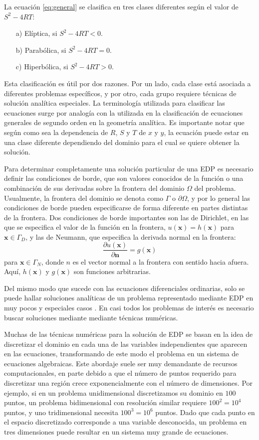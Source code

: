 La ecuación \eqref{eq:general} se clasifica en tres clases diferentes según el valor de $S^2-4RT$:
\begin{itemize}
 \item[a)] Elíptica, si $S^2-4RT < 0$.
 \item[b)] Parabólica, si $S^2-4RT = 0$.
 \item[c)] Hiperbólica, si $S^2-4RT > 0.$
\end{itemize}


Esta clasificación es útil por dos razones. Por un lado, cada clase está asociada a diferentes problemas específicos, y por otro, cada grupo requiere técnicas de solución analítica especiales. La terminología utilizada para clasificar las ecuaciones surge por analogía con la utilizada en la clasificación de ecuaciones generales de segundo orden en la geometría analítica. Es importante notar que según como sea la dependencia de $R$, $S$ y $T$ de $x$ y $y$, la ecuación puede estar en una clase diferente dependiendo del dominio para el cual se quiere obtener la solución.

Para determinar completamente una solución particular de una EDP es necesario definir las condiciones de borde, que son valores conocidos de la función o una combinación de sus derivadas sobre la frontera del dominio $\Omega$ del problema. Usualmente, la frontera del dominio se denota como $\Gamma$ o $\partial \Omega$, y por lo general las condiciones de borde pueden especificarse de forma diferente en partes distintas de la frontera. Dos condiciones de borde importantes son las de Dirichlet, en las que se especifica el valor de la función en la frontera, $u(\bm{x}) = h(\bm{x})$ para $\bm{x} \in \Gamma_D$, y las de Neumann, que especifica la derivada normal en la frontera:
\[ \frac{\partial u(\bm{x})}{\partial \bm{n}} = g(\bm{x}) \]
para $\bm{x} \in \Gamma_N$, donde $n$ es el vector normal a la frontera con sentido hacia afuera. Aquí, $h(\bm{x})$ y $g(\bm{x})$ son funciones arbitrarias.

Del mismo modo que sucede con las ecuaciones diferenciales ordinarias, solo se puede hallar soluciones analíticas de un problema representado mediante EDP en muy pocos y especiales casos \cite{tijonov1983}. En casi todos los problemas de interés es necesario buscar soluciones mediante mediante técnicas numéricas. 

Muchas de las técnicas numéricas para la solución de EDP se basan en la idea de discretizar el dominio en cada una de las variables independientes que aparecen en las ecuaciones, transformando de este modo el problema en un sistema de ecuaciones algebraicas. Este abordaje suele ser muy demandante de recursos computacionales, en parte debido a que el número de puntos requerido para discretizar una región crece exponencialmente con el número de dimensiones. Por ejemplo, si en un problema unidimensional discretizamos su dominio en $100$ puntos, un problema bidimensional con resolución similar requiere $100^2 = 10^4$ puntos, y uno tridimensional necesita $100^3 = 10^6$ puntos. Dado que cada punto en el espacio discretizado corresponde a una variable desconocida, un problema en tres dimensiones puede resultar en un sistema muy grande de ecuaciones.

